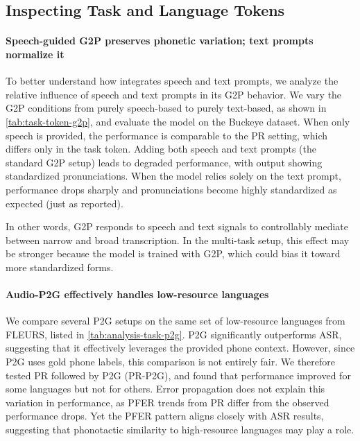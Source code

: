 \subsection{Inspecting Task and Language Tokens}
\label{sec:analysis-task-lang}

\paragraph{Speech-guided G2P preserves phonetic variation; text prompts normalize it} %
To better understand how \POWSM integrates speech and text prompts, we analyze the relative influence of speech and text prompts in its G2P behavior.
We vary the G2P conditions from purely speech-based to purely text-based, as shown in \autoref{tab:task-token-g2p}, and evaluate the model on the Buckeye dataset.
When only speech is provided, the performance is comparable to the PR setting, which differs only in the task token.
Adding both speech and text prompts (the standard G2P setup) leads to degraded performance, with output showing standardized pronunciations.
When the model relies solely on the text prompt, performance drops sharply and pronunciations become highly standardized as expected (just as \citet{zhu-etal-2025-zipa} reported).

In other words, \POWSM G2P responds to speech and text signals to controllably mediate between narrow and broad transcription.
In the multi-task setup, this effect may be stronger because the model is trained with G2P, which could bias it toward more standardized forms.

\paragraph{Audio-P2G effectively handles low-resource languages}
\label{sec:analysis-p2g-good}
We compare several P2G setups on the same set of low-resource languages from FLEURS, listed in \autoref{tab:analysis-task-p2g}. P2G significantly outperforms ASR, suggesting that it effectively leverages the provided phone context. 
However, since P2G uses gold phone labels, this comparison is not entirely fair. We therefore tested PR followed by P2G (PR-P2G), and found that performance improved for some languages but not for others. 
Error propagation does not explain this variation in performance, as PFER trends from PR differ from the observed performance drops. Yet the PFER pattern aligns closely with ASR results, suggesting that phonotactic similarity to high-resource languages may play a role.

